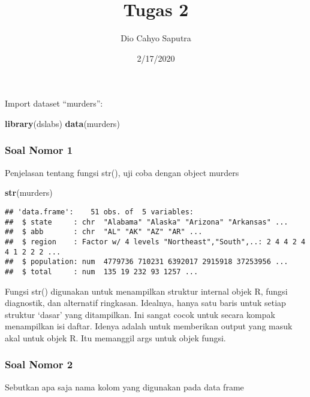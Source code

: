 \documentclass[
]{article}
\title{Tugas 2}
\author{Dio Cahyo Saputra}
\date{2/17/2020}
\newenvironment{Shaded}{\begin{snugshade}}{\end{snugshade}}
\newcommand{\KeywordTok}[1]{\textcolor[rgb]{0.13,0.29,0.53}{\textbf{#1}}}
\newcommand{\NormalTok}[1]{#1}
\begin{document}
\maketitle

Import dataset ``murders'':

\begin{Shaded}
\begin{Highlighting}[]
\KeywordTok{library}\NormalTok{(dslabs)}
\KeywordTok{data}\NormalTok{(murders)}
\end{Highlighting}
\end{Shaded}

\hypertarget{soal-nomor-1}{%
\subsubsection{Soal Nomor 1}\label{soal-nomor-1}}

Penjelasan tentang fungsi str(), uji coba dengan object murders

\begin{Shaded}
\begin{Highlighting}[]
\KeywordTok{str}\NormalTok{(murders)}
\end{Highlighting}
\end{Shaded}

\begin{verbatim}
## 'data.frame':    51 obs. of  5 variables:
##  $ state     : chr  "Alabama" "Alaska" "Arizona" "Arkansas" ...
##  $ abb       : chr  "AL" "AK" "AZ" "AR" ...
##  $ region    : Factor w/ 4 levels "Northeast","South",..: 2 4 4 2 4 4 1 2 2 2 ...
##  $ population: num  4779736 710231 6392017 2915918 37253956 ...
##  $ total     : num  135 19 232 93 1257 ...
\end{verbatim}

Fungsi str() digunakan untuk menampilkan struktur internal objek R,
fungsi diagnostik, dan alternatif ringkasan. Idealnya, hanya satu baris
untuk setiap struktur `dasar' yang ditampilkan. Ini sangat cocok untuk
secara kompak menampilkan isi daftar. Idenya adalah untuk memberikan
output yang masuk akal untuk objek R. Itu memanggil args untuk objek
fungsi.

\hypertarget{soal-nomor-2}{%
\subsubsection{Soal Nomor 2}\label{soal-nomor-2}}

Sebutkan apa saja nama kolom yang digunakan pada data frame
\end{document}
